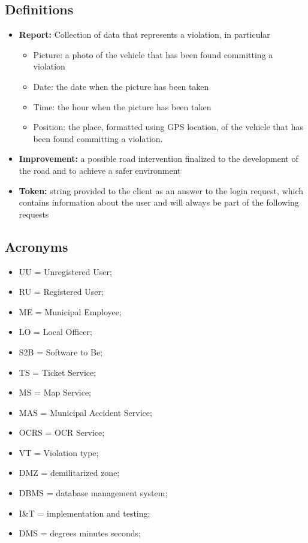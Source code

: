 			\subsection{Definitions}
				\begin{itemize}
					\item \textbf{Report:} Collection of data that represents a violation, in particular
						\begin{itemize}
							\item Picture: a photo of the vehicle that has been found committing a violation
							\item Date: the date when the picture has been taken
							\item Time: the hour when the picture has been taken
							\item Position: the place, formatted using GPS location, of the vehicle that has been found committing a violation.
						\end{itemize}
					\item \textbf{Improvement:} a possible road intervention finalized to the development of the road and to achieve a safer environment
					\item \textbf{Token:} string provided to the client as an answer to the login request, which contains information about the user and will always be part of the following requests
				\end{itemize}
			\subsection{Acronyms}
				\begin{itemize}
					\item UU = Unregistered User;
					\item RU = Registered User;
					\item ME = Municipal Employee;
					\item LO = Local Officer;
					\item S2B = Software to Be;
					\item TS = Ticket Service;
					\item MS = Map Service;
					\item MAS = Municipal Accident Service;
					\item OCRS = OCR Service;
					\item VT = Violation type;
					\item DMZ = demilitarized zone;
					\item DBMS = database management system;
					\item I\&T = implementation and testing;
					\item DMS = degrees minutes seconds;
				\end{itemize}
					
